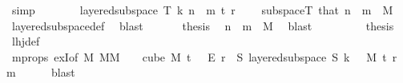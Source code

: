 \begin{isabellebody}
\ simp\isanewline
\ \ \ \ \isamarkupfalse%
\ \isamarkupfalse%
\ {\isachardoublequoteopen}layered{\isacharunderscore}{\kern0pt}subspace\ T\ {\isacharparenleft}{\kern0pt}k{\isacharplus}{\kern0pt}{}{\isacharparenright}{\kern0pt}\ {\isacharparenleft}{\kern0pt}n\ {\isacharplus}{\kern0pt}\ m{\isacharparenright}{\kern0pt}\ t\ r\ {\isasymchi}{\isachardoublequoteclose}\ \ \isamarkupfalse%
\ subspace{\isacharunderscore}{\kern0pt}T\ that{\isacharparenleft}{\kern0pt}{}{\isacharparenright}{\kern0pt}\ {\isacartoucheopen}n\ {\isacharplus}{\kern0pt}\ m\ {\isacharequal}{\kern0pt}\ M{\isacharprime}{\kern0pt}{\isacartoucheclose}\ \isamarkupfalse%
\ layered{\isacharunderscore}{\kern0pt}subspace{\isacharunderscore}{\kern0pt}def\ \isamarkupfalse%
\ blast\isanewline
\ \ \ \isamarkupfalse%
\ \isamarkupfalse%
\ {\isacharquery}{\kern0pt}thesis\ \isamarkupfalse%
\ {\isacartoucheopen}n\ {\isacharplus}{\kern0pt}\ m\ {\isacharequal}{\kern0pt}\ M{\isacharprime}{\kern0pt}{\isacartoucheclose}\ \isamarkupfalse%
\ blast\ \isanewline
\ \ \isamarkupfalse%
\isanewline
\ \ \isamarkupfalse%
\ \isamarkupfalse%
\ {\isacharquery}{\kern0pt}thesis\ \isamarkupfalse%
\ lhj{\isacharunderscore}{\kern0pt}def\ \isamarkupfalse%
\ m{\isacharunderscore}{\kern0pt}props\ exI{\isacharbrackleft}{\kern0pt}of\ {\isachardoublequoteopen}{\isasymlambda}M{\isachardot}{\kern0pt}\ {\isasymforall}M{\isacharprime}{\kern0pt}{\isasymge}M{\isachardot}{\kern0pt}\ {\isasymforall}{\isasymchi}{\isachardot}{\kern0pt}\ {\isasymchi}\ {\isasymin}\ cube\ M{\isacharprime}{\kern0pt}\ {\isacharparenleft}{\kern0pt}t\ {\isacharplus}{\kern0pt}\ {}{\isacharparenright}{\kern0pt}\ {\isasymrightarrow}\isactrlsub E\ {\isacharbraceleft}{\kern0pt}{\isachardot}{\kern0pt}{\isachardot}{\kern0pt}{\isacharless}{\kern0pt}r{\isacharbraceright}{\kern0pt}\ {\isasymlongrightarrow}\ {\isacharparenleft}{\kern0pt}{\isasymexists}S{\isachardot}{\kern0pt}\ layered{\isacharunderscore}{\kern0pt}subspace\ S\ {\isacharparenleft}{\kern0pt}k\ {\isacharplus}{\kern0pt}\ {}{\isacharparenright}{\kern0pt}\ M{\isacharprime}{\kern0pt}\ t\ r\ {\isasymchi}{\isacharparenright}{\kern0pt}{\isachardoublequoteclose}\ m{\isacharbrackright}{\kern0pt}\isanewline
\ \ \ \ \isamarkupfalse%
\ blast\isanewline
{}\isamarkupfalse%
%
\endisatagproof
{\isafoldproof}%
%
\isadelimproof

\end{isabellebody}
